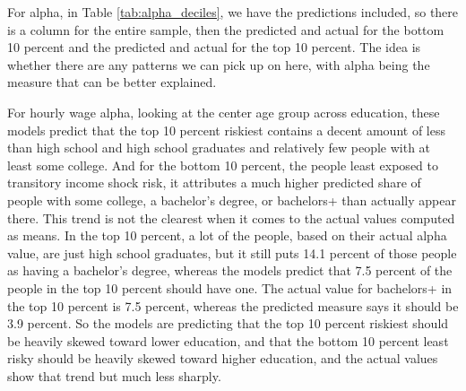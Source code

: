 \documentclass[12pt]{article}
\begin{document}
\begin{onehalfspace}
For alpha, in Table \ref{tab:alpha_deciles}, we have the predictions included, so there is a column for the entire sample, then the predicted and actual for the bottom 10 percent and the predicted and actual for the top 10 percent. The idea is whether there are any patterns we can pick up on here, with alpha being the measure that can be better explained.

\begin{table}[H]
    \centering
    \caption{Mean Ensemble-Predicted Alpha in the Top and Bottom Predicted-Risk Deciles by Age, Annual Earnings (x 100)}
    \label{tab:alpha_deciles}
    \resizebox{\textwidth}{!}{%
        
    }
\end{table}

For hourly wage alpha, looking at the center age group across education, these models predict that the top 10 percent riskiest contains a decent amount of less than high school and high school graduates and relatively few people with at least some college. And for the bottom 10 percent, the people least exposed to transitory income shock risk, it attributes a much higher predicted share of people with some college, a bachelor's degree, or bachelors+ than actually appear there. This trend is not the clearest when it comes to the actual values computed as means. In the top 10 percent, a lot of the people, based on their actual alpha value, are just high school graduates, but it still puts 14.1 percent of those people as having a bachelor's degree, whereas the models predict that 7.5 percent of the people in the top 10 percent should have one. The actual value for bachelors+ in the top 10 percent is 7.5 percent, whereas the predicted measure says it should be 3.9 percent. So the models are predicting that the top 10 percent riskiest should be heavily skewed toward lower education, and that the bottom 10 percent least risky should be heavily skewed toward higher education, and the actual values show that trend but much less sharply.


\end{onehalfspace}
\end{document}
